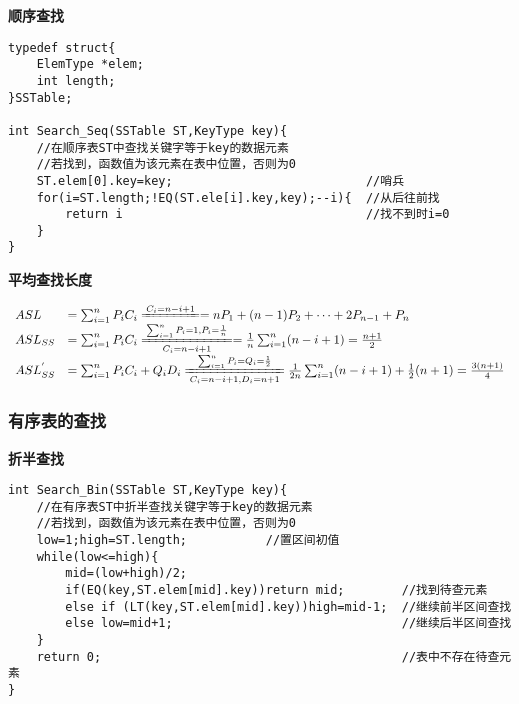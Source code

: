 \documentclass[UTF8]{ctexart}
\newcommand{\mb}[1]{\textbf{#1}}
\newcommand{\p}{\par}
\newcommand{\ma}[1]{\begin{array}{llll} #1 \end{array}}
\newcommand{\meq}[2]{\xlongequal[#2]{#1}}
\begin{document}
\mb{顺序查找}\p
\begin{lstlisting}[style=v1]
typedef struct{ 
    ElemType *elem;
    int length;
}SSTable;

int Search_Seq(SSTable ST,KeyType key){
    //在顺序表ST中查找关键字等于key的数据元素
    //若找到，函数值为该元素在表中位置，否则为0
    ST.elem[0].key=key;                           //哨兵  
    for(i=ST.length;!EQ(ST.ele[i].key,key);--i){  //从后往前找
        return i                                  //找不到时i=0 
    }
}
\end{lstlisting}

\mb{平均查找长度}\p

$$\ma{ASL&=\sum_{i=1}^nP_iC_i\meq{C_i=n-i+1}{}=nP_1+(n-1)P_2+\dots+2P_{n-1}+P_n\\
    ASL_{SS}&=\sum_{i=1}^nP_iC_i\meq{\sum_{i=1}^nP_i=1,P_i=\frac{1}{n}}{C_i=n-i+1}=\frac{1}{n}\sum_{i=1}^n(n-i+1)=\frac{n+1}{2}\\
    ASL_{SS}^{'}&=\sum_{i=1}^nP_iC_i+Q_iD_i\meq{\sum_{i=1}^nP_i=Q_i=\frac{1}{2}}{C_i=n-i+1,D_i=n+1}\frac{1}{2n}\sum_{i=1}^n(n-i+1)+\frac{1}{2}(n+1)=\frac{3(n+1)}{4}
}$$


\subsubsection{有序表的查找}
\mb{折半查找}\p
\begin{lstlisting}[style=v1]
int Search_Bin(SSTable ST,KeyType key){
    //在有序表ST中折半查找关键字等于key的数据元素
    //若找到，函数值为该元素在表中位置，否则为0
    low=1;high=ST.length;           //置区间初值
    while(low<=high){   
        mid=(low+high)/2;
        if(EQ(key,ST.elem[mid].key))return mid;        //找到待查元素
        else if (LT(key,ST.elem[mid].key))high=mid-1;  //继续前半区间查找
        else low=mid+1;                                //继续后半区间查找
    }                   
    return 0;                                          //表中不存在待查元素
}
\end{lstlisting}
\end{document}
